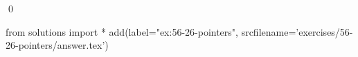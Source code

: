 
\begin{ex}
  \label{ex:56-26-pointers}
  
  \qed
\end{ex}
\begin{python0}
from solutions import *
add(label="ex:56-26-pointers",
    srcfilename='exercises/56-26-pointers/answer.tex')
\end{python0}
